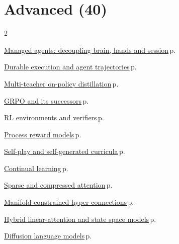 \documentclass[10pt,a4paper,openany]{report}
\begin{document}
\section{Advanced (40)}
\begin{multicols}{2}\small\raggedright
\hyperref[c:agents-2]{Managed agents: decoupling brain, hands and session}\,{\color{muted}\scriptsize p.\,\pageref{c:agents-2}}\par\vspace{1pt}
\hyperref[c:agents-13]{Durable execution and agent trajectories}\,{\color{muted}\scriptsize p.\,\pageref{c:agents-13}}\par\vspace{1pt}
\hyperref[c:reasoning-3]{Multi-teacher on-policy distillation}\,{\color{muted}\scriptsize p.\,\pageref{c:reasoning-3}}\par\vspace{1pt}
\hyperref[c:reasoning-4]{GRPO and its successors}\,{\color{muted}\scriptsize p.\,\pageref{c:reasoning-4}}\par\vspace{1pt}
\hyperref[c:reasoning-5]{RL environments and verifiers}\,{\color{muted}\scriptsize p.\,\pageref{c:reasoning-5}}\par\vspace{1pt}
\hyperref[c:reasoning-8]{Process reward models}\,{\color{muted}\scriptsize p.\,\pageref{c:reasoning-8}}\par\vspace{1pt}
\hyperref[c:reasoning-10]{Self-play and self-generated curricula}\,{\color{muted}\scriptsize p.\,\pageref{c:reasoning-10}}\par\vspace{1pt}
\hyperref[c:reasoning-11]{Continual learning}\,{\color{muted}\scriptsize p.\,\pageref{c:reasoning-11}}\par\vspace{1pt}
\hyperref[c:arch-2]{Sparse and compressed attention}\,{\color{muted}\scriptsize p.\,\pageref{c:arch-2}}\par\vspace{1pt}
\hyperref[c:arch-3]{Manifold-constrained hyper-connections}\,{\color{muted}\scriptsize p.\,\pageref{c:arch-3}}\par\vspace{1pt}
\hyperref[c:arch-4]{Hybrid linear-attention and state space models}\,{\color{muted}\scriptsize p.\,\pageref{c:arch-4}}\par\vspace{1pt}
\hyperref[c:arch-5]{Diffusion language models}\,{\color{muted}\scriptsize p.\,\pageref{c:arch-5}}\par\vspace{1pt}

\end{multicols}
\end{document}
